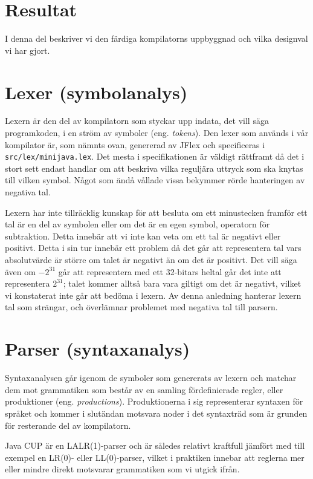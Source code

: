\documentclass[a4paper,11pt]{article}
\newcommand{\trans}[2][eng.]{(#1 \emph{#2})}
\renewcommand{\*}[0]{\cdot}
\begin{document}
\section*{Resultat}

I denna del beskriver vi den färdiga kompilatorns uppbyggnad och vilka
designval vi har gjort.

\section*{Lexer (symbolanalys)}

Lexern är den del av kompilatorn som styckar upp indata, det vill säga
programkoden, i en ström av symboler \trans{tokens}. Den lexer som används i
vår kompilator är, som nämnts ovan, genererad av JFlex och specificeras i
\texttt{src/lex/minijava.lex}. Det mesta i specifikationen är väldigt rättframt
då det i stort sett endast handlar om att beskriva vilka reguljära uttryck som
ska knytas till vilken symbol. Något som ändå vållade vissa bekymmer rörde
hanteringen av negativa tal.

Lexern har inte tillräcklig kunskap för att besluta om ett minustecken framför
ett tal är en del av symbolen eller om det är en egen symbol, operatorn för
subtraktion. Detta innebär att vi inte kan veta om ett tal är negativt eller
positivt. Detta i sin tur innebär ett problem då det går att representera tal
vars absolutvärde är större om talet är negativt än om det är positivt. Det
vill säga även om $-2^{31}$ går att representera med ett 32-bitars heltal går
det inte att representera $2^{31}$; talet kommer alltså bara vara giltigt om
det är negativt, vilket vi konstaterat inte går att bedöma i lexern. Av denna
anledning hanterar lexern tal som strängar, och överlämnar problemet med
negativa tal till parsern.

\section*{Parser (syntaxanalys)}

Syntaxanalysen går igenom de symboler som genererats av lexern och matchar dem
mot grammatiken som består av en samling fördefinierade regler, eller
produktioner \trans{productions}. Produktionerna i sig representerar syntaxen
för språket och kommer i slutändan motsvara noder i det syntaxträd som är
grunden för resterande del av kompilatorn.

Java CUP är en LALR(1)-parser och är således relativt kraftfull jämfört med
till exempel en LR(0)- eller LL(0)-parser, vilket i praktiken innebar att
reglerna mer eller mindre direkt motsvarar grammatiken som vi utgick ifrån.
\end{document}
